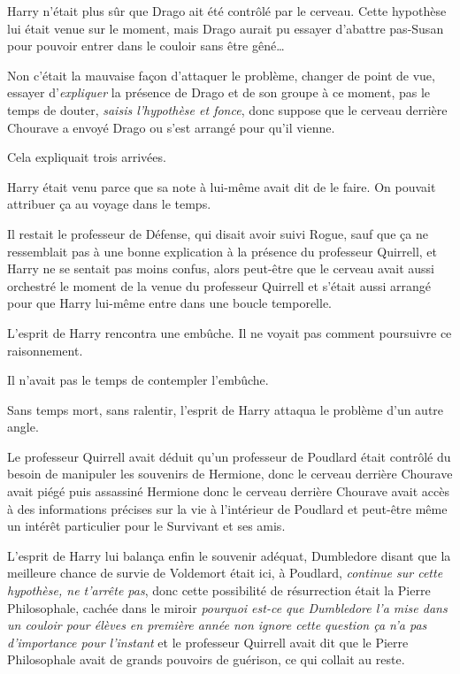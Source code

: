 Harry n'était plus sûr que Drago ait été contrôlé par le cerveau. Cette hypothèse lui était venue sur le moment, mais Drago aurait pu essayer d'abattre pas-Susan pour pouvoir entrer dans le couloir sans être gêné…

Non c'était la mauvaise façon d'attaquer le problème, changer de point de vue, essayer d'\emph{expliquer} la présence de Drago et de son groupe à ce moment, pas le temps de douter, \emph{saisis l'hypothèse et fonce}, donc suppose que le cerveau derrière Chourave a envoyé Drago ou s'est arrangé pour qu'il vienne.

Cela expliquait trois arrivées.

Harry était venu parce que sa note à lui-même avait dit de le faire. On pouvait attribuer ça au voyage dans le temps.

Il restait le professeur de Défense, qui disait avoir suivi Rogue, sauf que ça ne ressemblait pas à une bonne explication à la présence du professeur Quirrell, et Harry ne se sentait pas moins confus, alors peut-être que le cerveau avait aussi orchestré le moment de la venue du professeur Quirrell et s'était aussi arrangé pour que Harry lui-même entre dans une boucle temporelle.

L'esprit de Harry rencontra une embûche. Il ne voyait pas comment poursuivre ce raisonnement.

Il n'avait pas le temps de contempler l'embûche.

Sans temps mort, sans ralentir, l'esprit de Harry attaqua le problème d'un autre angle.

Le professeur Quirrell avait déduit qu'un professeur de Poudlard était contrôlé du besoin de manipuler les souvenirs de Hermione, donc le cerveau derrière Chourave avait piégé puis assassiné Hermione donc le cerveau derrière Chourave avait accès à des informations précises sur la vie à l'intérieur de Poudlard et peut-être même un intérêt particulier pour le Survivant et ses amis.

L'esprit de Harry lui balança enfin le souvenir adéquat, Dumbledore disant que la meilleure chance de survie de Voldemort était ici, à Poudlard, \emph{continue sur cette hypothèse, ne t'arrête pas}, donc cette possibilité de résurrection était la Pierre Philosophale, cachée dans le miroir \emph{pourquoi est-ce que Dumbledore l'a mise dans un couloir pour élèves en première année non ignore cette question ça n'a pas d'importance pour l'instant} et le professeur Quirrell avait dit que le Pierre Philosophale avait de grands pouvoirs de guérison, ce qui collait au reste.

